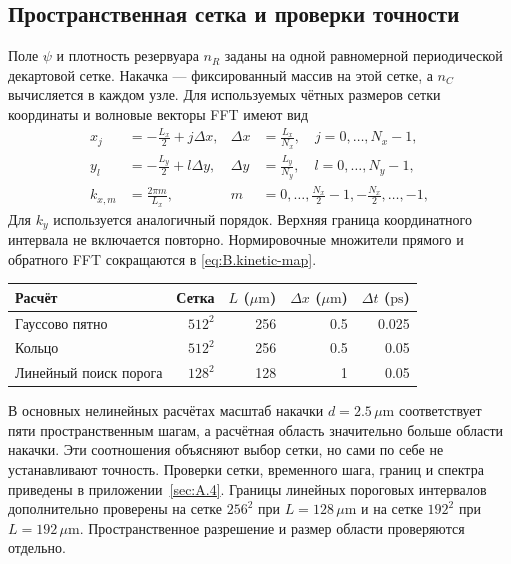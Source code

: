\documentclass[12pt,a4paper]{article}
\begin{document}
\subsection{Пространственная сетка и проверки точности}\label{sec:B.4}
Поле \(\psi\) и плотность резервуара \(n_R\) заданы на одной равномерной периодической декартовой сетке. Накачка --- фиксированный массив на этой сетке, а \(n_C\) вычисляется в каждом узле. Для используемых чётных размеров сетки координаты и волновые векторы FFT имеют вид
\begin{equation}
\begin{aligned}
x_j&=-\frac{L_x}{2}+j\Delta x,
&\Delta x&=\frac{L_x}{N_x},\quad j=0,\ldots,N_x-1,\\
y_l&=-\frac{L_y}{2}+l\Delta y,
&\Delta y&=\frac{L_y}{N_y},\quad l=0,\ldots,N_y-1,\\
k_{x,m}&=\frac{2\pi m}{L_x},
&m&=0,\ldots,\frac{N_x}{2}-1,-\frac{N_x}{2},\ldots,-1,
\end{aligned}\label{eq:B.grid}
\end{equation}
Для \(k_y\) используется аналогичный порядок. Верхняя граница координатного интервала не включается повторно. Нормировочные множители прямого и обратного FFT сокращаются в \eqref{eq:B.kinetic-map}.

\begin{center}
\small\begin{tabular}{lrrrr}
\hline
Расчёт & Сетка & \(L\) (\(\mu\mathrm m\)) & \(\Delta x\) (\(\mu\mathrm m\)) & \(\Delta t\) (\(\mathrm{ps}\))\\
\hline
Гауссово пятно & \(512^2\) & 256 & 0.5 & 0.025\\
Кольцо & \(512^2\) & 256 & 0.5 & 0.05\\
Линейный поиск порога & \(128^2\) & 128 & 1 & 0.05\\
\hline
\end{tabular}
\end{center}
В основных нелинейных расчётах масштаб накачки \(d=2.5\,\mu\mathrm m\) соответствует пяти пространственным шагам, а расчётная область значительно больше области накачки. Эти соотношения объясняют выбор сетки, но сами по себе не устанавливают точность. Проверки сетки, временного шага, границ и спектра приведены в приложении~\ref{sec:A.4}. Границы линейных пороговых интервалов дополнительно проверены на сетке \(256^2\) при \(L=128\,\mu\mathrm m\) и на сетке \(192^2\) при \(L=192\,\mu\mathrm m\). Пространственное разрешение и размер области проверяются отдельно.
\end{document}
